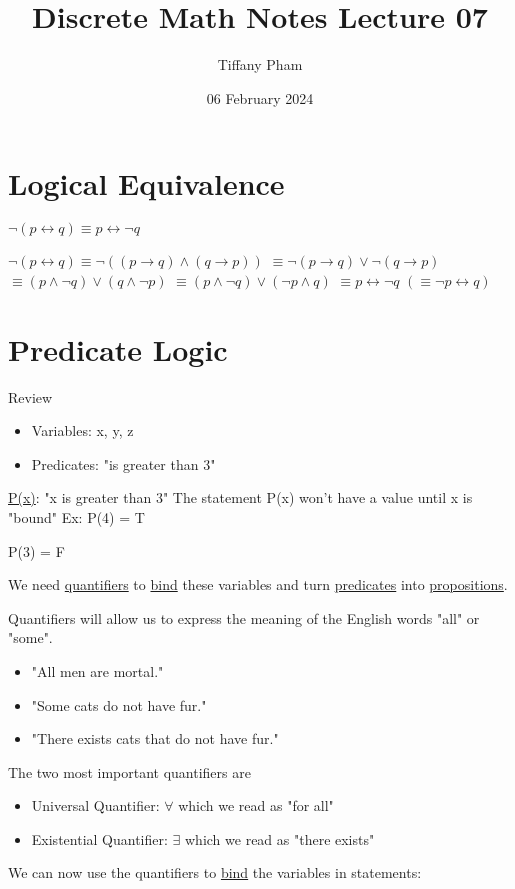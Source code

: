 \documentclass{article}
\title{Discrete Math Notes Lecture 07}
\author{Tiffany Pham}
\date{06 February 2024}
\begin{document}
\maketitle

\section{Logical Equivalence}
$\lnot(p\leftrightarrow q)\equiv p\leftrightarrow\lnot q$

\hfill \break
$\lnot(p\leftrightarrow q)\equiv\lnot((p\rightarrow q)\land(q\rightarrow p))$
\hfill \break
$\equiv\lnot(p\rightarrow q)\lor\lnot(q\rightarrow p)$
\hfill \break
$\equiv(p\land\lnot q)\lor(q\land\lnot p)$
\hfill \break
$\equiv(p\land\lnot q)\lor(\lnot p\land q)$
\hfill \break
$\equiv p\leftrightarrow\lnot q$
\hfill \break
$(\equiv\lnot p\leftrightarrow q)$

\section{Predicate Logic}
Review
\begin{itemize}
    \item Variables: x, y, z
    \item Predicates: "is greater than 3"
\end{itemize}
\underline{P(x)}: "x is greater than 3"
\hfill \break
The statement P(x) won't have a value until x is "bound"
\hfill \break
Ex: P(4) = T

P(3) = F

\hfill \break
We need \underline{quantifiers} to \underline{bind} these variables and turn \underline{predicates} into \underline{propositions}.

\hfill \break
Quantifiers will allow us to express the meaning of the English words "all" or "some".
\begin{itemize}
    \item "All men are mortal."
    \item "Some cats do not have fur."
    \item "There exists cats that do not have fur."
\end{itemize}
The two most important quantifiers are
\begin{itemize}
    \item Universal Quantifier: $\forall$ which we read as "for all"
    \item Existential Quantifier: $\exists$ which we read as "there exists"
\end{itemize}
We can now use the quantifiers to \underline{bind} the variables in statements:
\end{document}
